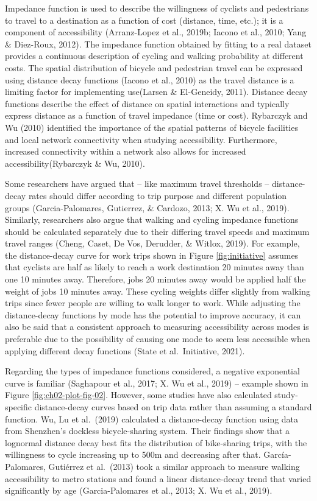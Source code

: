 \documentclass[
11pt, %
oneside, %
english, %
singlespacing, %
]{macthesis} %
\begin{document}
Impedance function is used to describe the willingness of cyclists and pedestrians to travel to a destination as a function of cost (distance, time, etc.); it is a component of accessibility (Arranz-Lopez et al., 2019b; Iacono et al., 2010; Yang \& Diez-Roux, 2012). The impedance function obtained by fitting to a real dataset provides a continuous description of cycling and walking probability at different costs. The spatial distribution of bicycle and pedestrian travel can be expressed using distance decay functions (Iacono et al., 2010) as the travel distance is a limiting factor for implementing use(Larsen \& El-Geneidy, 2011). Distance decay functions describe the effect of distance on spatial interactions and typically express distance as a function of travel impedance (time or cost). Rybarczyk and Wu (2010) identified the importance of the spatial patterns of bicycle facilities and local network connectivity when studying accessibility. Furthermore, increased connectivity within a network also allows for increased accessibility(Rybarczyk \& Wu, 2010).

Some researchers have argued that -- like maximum travel thresholds -- distance-decay rates should differ according to trip purpose and different population groups (Garcia-Palomares, Gutierrez, \& Cardozo, 2013; X. Wu et al., 2019). Similarly, researchers also argue that walking and cycling impedance functions should be calculated separately due to their differing travel speeds and maximum travel ranges (Cheng, Caset, De Vos, Derudder, \& Witlox, 2019). For example, the distance-decay curve for work trips shown in Figure \ref{fig:initiative} assumes that cyclists are half as likely to reach a work destination 20 minutes away than one 10 minutes away. Therefore, jobs 20 minutes away would be applied half the weight of jobs 10 minutes away. These cycling weights differ slightly from walking trips since fewer people are willing to walk longer to work. While adjusting the distance-decay functions by mode has the potential to improve accuracy, it can also be said that a consistent approach to measuring accessibility across modes is preferable due to the possibility of causing one mode to seem less accessible when applying different decay functions (State et al.~Initiative, 2021).

Regarding the types of impedance functions considered, a negative exponential curve is familiar (Saghapour et al., 2017; X. Wu et al., 2019) -- example shown in Figure \ref{fig:ch02-plot-fig-02}. However, some studies have also calculated study-specific distance-decay curves based on trip data rather than assuming a standard function. Wu, Lu et al.~(2019) calculated a distance-decay function using data from Shenzhen's dockless bicycle-sharing system. Their findings show that a lognormal distance decay best fits the distribution of bike-sharing trips, with the willingness to cycle increasing up to 500m and decreasing after that. García-Palomares, Gutiérrez et al.~(2013) took a similar approach to measure walking accessibility to metro stations and found a linear distance-decay trend that varied significantly by age (Garcia-Palomares et al., 2013; X. Wu et al., 2019).
\end{document}

